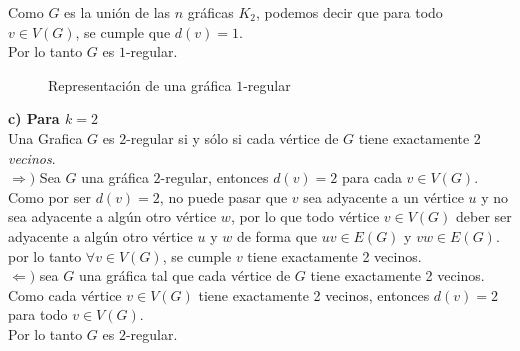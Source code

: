 \documentclass[12pt]{article}
\begin{document}
Como $G$ es la unión de las $n$ gráficas $K_2$, podemos decir que para todo $v \in V(G)$, se cumple que $d(v) = 1$.\\

Por lo tanto $G$ es $1$-regular.\\

\begin{figure}[h!]
    \centering
    \begin{minipage}{0.6\textwidth}
        \centering
        \caption{Representación de una gráfica $1$-regular}
    \end{minipage}
\end{figure}

\textbf{c) Para $k = 2$} \\

Una Grafica $G$ es $2$-regular si y sólo si cada vértice de $G$ tiene exactamente 2 \textit{vecinos}.\\

$\Longrightarrow)$ Sea $G$ una gráfica $2$-regular, entonces $d(v) = 2$ para cada $v \in V(G)$.\\

Como por ser $d(v) = 2$, no puede pasar que $v$ sea adyacente a un vértice $u$ y no sea adyacente 
a algún otro vértice $w$, por lo que todo vértice $v \in V(G)$ deber ser adyacente a algún otro vértice $u$ y $w$
de forma que $uv \in E(G)$ y $vw \in E(G)$.\\

por lo tanto $\forall v \in V(G)$, se cumple $v$ tiene exactamente 2 vecinos.\\

$\Longleftarrow)$ sea $G$ una gráfica tal que cada vértice de $G$ tiene exactamente 2 vecinos.\\

Como cada vértice $v \in V(G)$ tiene exactamente 2 vecinos, entonces $d(v) = 2$ para todo $v \in V(G)$.\\

Por lo tanto $G$ es $2$-regular.\\
\end{document}
